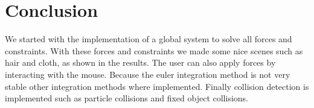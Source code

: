 \section{Conclusion}

We started with the implementation of a global system to solve all forces and constraints.
With these forces and constraints we made some nice scenes such as hair and cloth, as shown in the results.
The user can also apply forces by interacting with the mouse.
Because the euler integration method is not very stable other integration methods where implemented.
Finally collision detection is implemented such as particle collisions and fixed object collisions.
